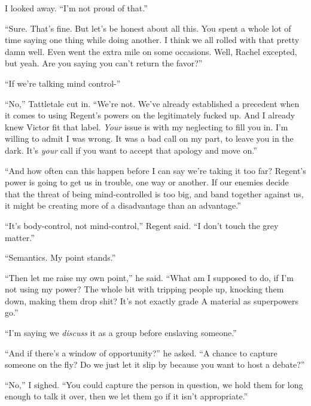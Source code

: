 I looked away.  ``I'm not proud of that.''



``Sure.  That's fine.  But let's be honest about all this.  You spent a whole lot of time saying one thing while doing another.  I think we all rolled with that pretty damn well.  Even went the extra mile on some occasions.  Well, Rachel excepted, but yeah.  Are you saying you can't return the favor?''



``If we're talking mind control-''



``No,'' Tattletale cut in.  ``We're not.  We've already established a precedent when it comes to using Regent's powers on the legitimately fucked up.  And I already knew Victor fit that label.  \emph{Your} issue is with my neglecting to fill you in.  I'm willing to admit I was wrong.  It was a bad call on my part, to leave you in the dark.  It's \emph{your} call if you want to accept that apology and move on.''



``And how often can this happen before I can say we're taking it too far?  Regent's power is going to get us in trouble, one way or another.  If our enemies decide that the threat of being mind-controlled is too big, and band together against us, it might be creating more of a disadvantage than an advantage.''



``It's body-control, not mind-control,'' Regent said.  ``I don't touch the grey matter.''



``Semantics.  My point stands.''



``Then let me raise my own point,'' he said.  ``What am I supposed to do, if I'm not using my power?  The whole bit with tripping people up, knocking them down, making them drop shit?  It's not exactly grade A material as superpowers go.''



``I'm saying we \emph{discuss} it as a group before enslaving someone.''



``And if there's a window of opportunity?'' he asked.  ``A chance to capture someone on the fly?  Do we just let it slip by because you want to host a debate?''



``No,'' I sighed.  ``You could capture the person in question, we hold them for long enough to talk it over, then we let them go if it isn't appropriate.''



